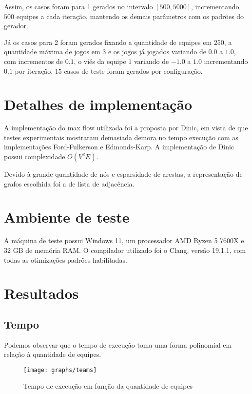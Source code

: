 \documentclass[11pt]{article}
\begin{document}
Assim, os casos foram para 1 gerados no intervalo $[500, 5000]$, incrementando $500$ equipes a cada iteração, mantendo os demais parâmetros com os padrões do gerador.

Já os casos para 2 foram gerados fixando a quantidade de equipes em $250$, a quantidade máxima de jogos em $3$ e os jogos já jogados variando de $0.0$ a $1.0$, com incrementos de $0.1$, o viés da equipe $1$ variando de $-1.0$ a $1.0$ incrementando $0.1$ por iteração. $15$ casos de teste foram gerados por configuração.

\section{Detalhes de implementação}

A implementação do max flow utilizada foi a proposta por Dinic, em vista de que testes experimentais mostraram demasiada demora no tempo execução com as implementações Ford-Fulkerson e Edmonds-Karp. A implementação de Dinic possui complexidade $O(V^2E)$.

Devido à grande quantidade de nós e esparsidade de arestas, a representação de grafos escolhida foi a de lista de adjacência.

\section{Ambiente de teste}

A máquina de teste possui Windows 11, um processador AMD Ryzen 5 7600X e 32 GB de memória RAM. O compilador utilizado foi o Clang, versão 19.1.1, com todas as otimizações padrões habilitadas.

\section{Resultados}

\subsection{Tempo}

Podemos observar que o tempo de execução toma uma forma polinomial em relação à quantidade de equipes.

\begin{figure}[H]
	\centering
	\caption{Tempo de execução em função da quantidade de equipes}
	\label{fig:teams}
	\texttt{[image: graphs/teams]}
\end{figure}
\end{document}
